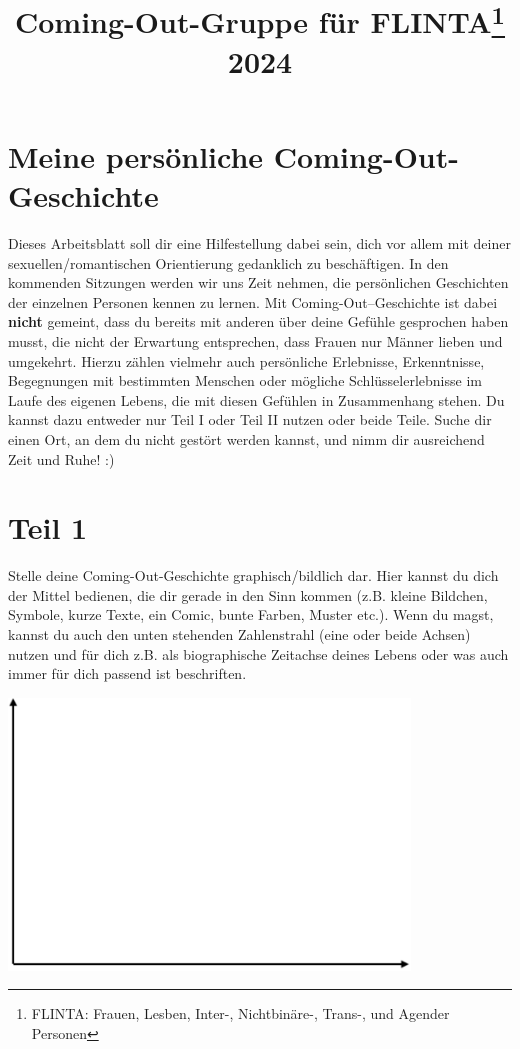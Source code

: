 \documentclass[a4paper,12pt]{article}
\title{Coming-Out-Gruppe für FLINTA\footnote{FLINTA: Frauen, Lesben, Inter-, Nichtbinäre-, Trans-, und Agender Personen} 2024}
\author{}
\date{}
\begin{document}
\maketitle

\section*{Meine persönliche Coming-Out-Geschichte}

Dieses Arbeitsblatt soll dir eine Hilfestellung dabei sein, dich vor allem mit deiner sexuellen/romantischen Orientierung gedanklich zu beschäftigen.  
In den kommenden Sitzungen werden wir uns Zeit nehmen, die persönlichen Geschichten der einzelnen Personen kennen zu lernen.  
Mit Coming-Out–Geschichte ist dabei \textbf{nicht} gemeint, dass du bereits mit anderen über deine Gefühle gesprochen haben musst, die nicht der Erwartung entsprechen, dass Frauen nur Männer lieben und umgekehrt.  
Hierzu zählen vielmehr auch persönliche Erlebnisse, Erkenntnisse, Begegnungen mit bestimmten Menschen oder mögliche Schlüsselerlebnisse im Laufe des eigenen Lebens, die mit diesen Gefühlen in Zusammenhang stehen.  
Du kannst dazu entweder nur Teil I oder Teil II nutzen oder beide Teile.  
Suche dir einen Ort, an dem du nicht gestört werden kannst, und nimm dir ausreichend Zeit und Ruhe! :)

\section*{Teil 1}

Stelle deine Coming-Out-Geschichte graphisch/bildlich dar. Hier kannst du dich der Mittel bedienen, die dir gerade in den Sinn kommen (z.B. kleine Bildchen, Symbole, kurze Texte, ein Comic, bunte Farben, Muster etc.). Wenn du magst, kannst du auch den unten stehenden Zahlenstrahl (eine oder beide Achsen) nutzen und für dich z.B. als biographische Zeitachse deines Lebens oder was auch immer für dich passend ist beschriften.

\begin{center}
    \includegraphics[width=0.8\textwidth]{zeitreihe.png}
\end{center}
\end{document}
